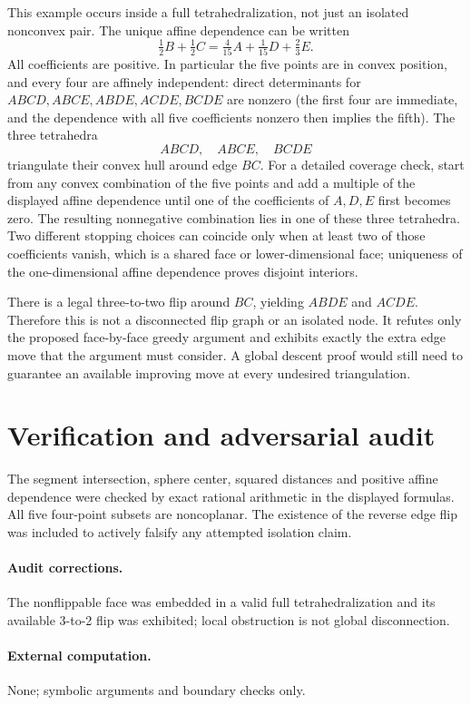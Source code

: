 \documentclass[11pt,a4paper]{article}
\begin{document}
This example occurs inside a full tetrahedralization, not just an isolated
nonconvex pair. The unique affine dependence can be written
\[
 \tfrac12 B+\tfrac12 C=\tfrac4{15}A+\tfrac1{15}D+\tfrac23E.
\]
All coefficients are positive. In particular the five points are in convex
position, and every four are affinely independent: direct determinants for
$ABCD,ABCE,ABDE,ACDE,BCDE$ are nonzero (the first four are immediate, and
the dependence with all five coefficients nonzero then implies the fifth).
The three tetrahedra
\[
 ABCD,\quad ABCE,\quad BCDE
\]
triangulate their convex hull around edge $BC$. For a detailed coverage check,
start from any convex combination of the five points and add a multiple of the
displayed affine dependence until one of the coefficients of $A,D,E$ first
becomes zero. The resulting nonnegative combination lies in one of these three
tetrahedra. Two different stopping choices can coincide only when at least two
of those coefficients vanish, which is a shared face or lower-dimensional face;
uniqueness of the one-dimensional affine dependence proves disjoint interiors.

There is a legal three-to-two flip around $BC$, yielding $ABDE$ and $ACDE$.
Therefore this is not a disconnected flip graph or an isolated node. It refutes
only the proposed face-by-face greedy argument and exhibits exactly the extra
edge move that the argument must consider. A global descent proof would still
need to guarantee an available improving move at every undesired triangulation.
\section{Verification and adversarial audit}
The segment intersection, sphere center, squared distances and positive
affine dependence were checked by exact rational arithmetic in the displayed
formulas. All five four-point subsets are noncoplanar. The existence of the
reverse edge flip was included to actively falsify any attempted isolation claim.
\paragraph{Audit corrections.} The nonflippable face was embedded in a valid full tetrahedralization and its available 3-to-2 flip was exhibited; local obstruction is not global disconnection.
\paragraph{External computation.} None; symbolic arguments and boundary checks only.
\end{document}
